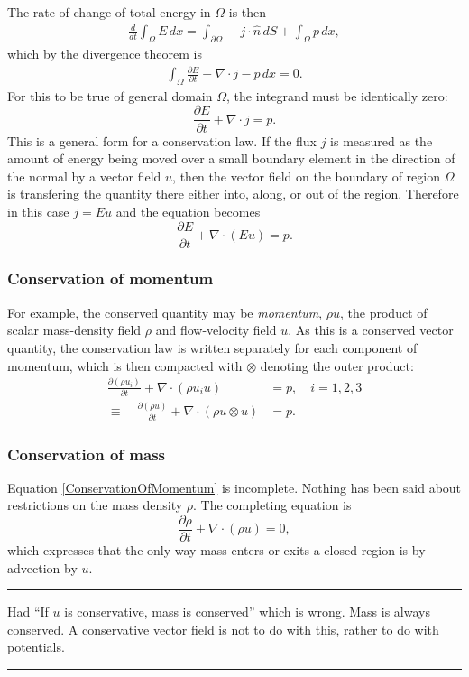 \documentclass[11pt,a4paper]{memoir}
\newcommand{\todo}[1]{\vskip 0.1in \hrule \vskip 0.03in {#1} \vskip 0.03in \hrule \vskip 0.1in}
\begin{document}
The rate of change of total energy in $\Omega$ is then 
\begin{align*}
    \frac{d}{dt} \int_\Omega E\, dx = \int_{\partial\Omega} -j\cdot \hat{n}\, dS + \int_\Omega p\, dx,
\end{align*}
which by the divergence theorem is
\begin{align*}
    \int_\Omega \frac{\partial E}{\partial t} + \nabla \cdot j - p\, dx = 0.
\end{align*}
For this to be true of general domain $\Omega$, the integrand must be identically zero:
\begin{equation}
    \frac{\partial E}{\partial t} + \nabla \cdot j = p.
\end{equation}
This is a general form for a conservation law. If the flux $j$ is measured as the amount of energy being moved over a small boundary element
in the direction of the normal by a vector field $u$, then the vector field on the boundary of region $\Omega$ is transfering the quantity there either into, along, or out of the region. Therefore in this case $j = E u$ and the equation becomes
\begin{equation}
    \frac{\partial E}{\partial t} + \nabla \cdot (E u) = p.
\end{equation}
\subsubsection{Conservation of momentum}
For example, the conserved quantity may be \textit{momentum}, $\rho u$, the product
of scalar mass-density field $\rho$ and flow-velocity field $u$. As this is a conserved vector quantity, the conservation law is written
separately for each component of momentum, which is then compacted with $\otimes$ denoting the outer product:
\begin{equation}\label{ConservationOfMomentum}
\begin{split}
    \frac{\partial(\rho u_i)}{\partial t} + \nabla \cdot \left(\rho u_i u\right) &= p, \quad i=1,2,3\\
    \equiv\quad \frac{\partial(\rho u)}{\partial t} + \nabla \cdot \left(\rho u \otimes u\right) &= p.
\end{split}
\end{equation}
\subsubsection{Conservation of mass}
Equation \eqref{ConservationOfMomentum} is incomplete. Nothing has been said about restrictions on the mass density $\rho$.
The completing equation is
\begin{equation}\label{ConservationOfMass}
    \frac{\partial \rho}{\partial t} + \nabla \cdot (\rho u) = 0,
\end{equation}
which expresses that the only way mass enters or exits a closed region is by advection by $u$.
\todo{
Had ``If $u$ is conservative, mass is conserved''
which is wrong. Mass is always conserved.
A conservative vector field is not to do with this, rather to do with potentials.
}
\end{document}
